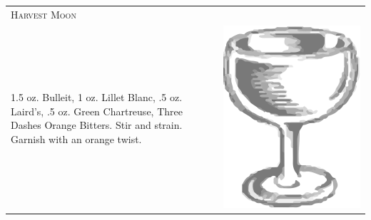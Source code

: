 \documentclass{article}
\begin{document}
\begin{multicols}{2}
\begin{tabular}{p{2in} p{0.5in}}
\multicolumn{2}{p{3in}}{\centering\Huge\textsc{Harvest Moon}} \\ 
  \vspace{-0.1in}1.5 oz. Bulleit, 1 oz. Lillet Blanc, .5 oz. Laird's, .5 oz. Green Chartreuse, Three Dashes Orange Bitters. Stir and strain. Garnish with an orange twist.  &
  \vspace{-0.1in} \includegraphics{coupe.png}
\end{tabular}
\end{multicols}
\end{document}
